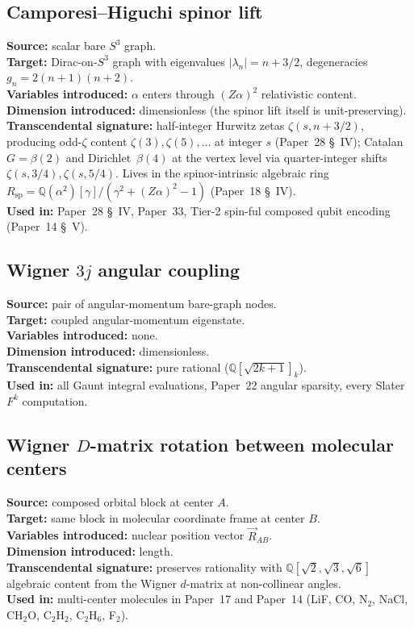 \documentclass[11pt]{article}
\begin{document}
\subsection{Camporesi--Higuchi spinor lift}
\label{sec:proj_spinor}
\textbf{Source:} scalar bare $S^3$ graph.\\
\textbf{Target:} Dirac-on-$S^3$ graph with eigenvalues
$|\lambda_n| = n + 3/2$, degeneracies $g_n = 2(n{+}1)(n{+}2)$.\\
\textbf{Variables introduced:} $\alpha$ enters through $(Z\alpha)^2$
relativistic content.\\
\textbf{Dimension introduced:} dimensionless (the spinor lift itself
is unit-preserving).\\
\textbf{Transcendental signature:} half-integer Hurwitz zetas
$\zeta(s, n + 3/2)$, producing odd-$\zeta$ content $\zeta(3),
\zeta(5), \ldots$ at integer $s$ (Paper~28 \S~IV); Catalan~$G =
\beta(2)$ and Dirichlet~$\beta(4)$ at the vertex level via
quarter-integer shifts $\zeta(s, 3/4), \zeta(s, 5/4)$.  Lives in
the spinor-intrinsic algebraic ring $R_\text{sp} =
\mathbb{Q}(\alpha^2)[\gamma]/(\gamma^2 + (Z\alpha)^2 - 1)$
(Paper~18 \S~IV).\\
\textbf{Used in:} Paper~28 \S~IV, Paper~33, Tier-2 spin-ful composed
qubit encoding (Paper~14 \S~V).

\subsection{Wigner $3j$ angular coupling}
\label{sec:proj_3j}
\textbf{Source:} pair of angular-momentum bare-graph nodes.\\
\textbf{Target:} coupled angular-momentum eigenstate.\\
\textbf{Variables introduced:} none.\\
\textbf{Dimension introduced:} dimensionless.\\
\textbf{Transcendental signature:} pure rational
($\mathbb{Q}[\sqrt{2k+1}]_{k}$).\\
\textbf{Used in:} all Gaunt integral evaluations, Paper~22 angular
sparsity, every Slater $F^k$ computation.

\subsection{Wigner $D$-matrix rotation between molecular centers}
\label{sec:proj_wignerD}
\textbf{Source:} composed orbital block at center $A$.\\
\textbf{Target:} same block in molecular coordinate frame at center
$B$.\\
\textbf{Variables introduced:} nuclear position vector
$\vec{R}_{AB}$.\\
\textbf{Dimension introduced:} length.\\
\textbf{Transcendental signature:} preserves rationality with
$\mathbb{Q}[\sqrt{2}, \sqrt{3}, \sqrt{6}]$ algebraic content from
the Wigner $d$-matrix at non-collinear angles.\\
\textbf{Used in:} multi-center molecules in Paper~17 and Paper~14
(LiF, CO, N$_2$, NaCl, CH$_2$O, C$_2$H$_2$, C$_2$H$_6$, F$_2$).
\end{document}
